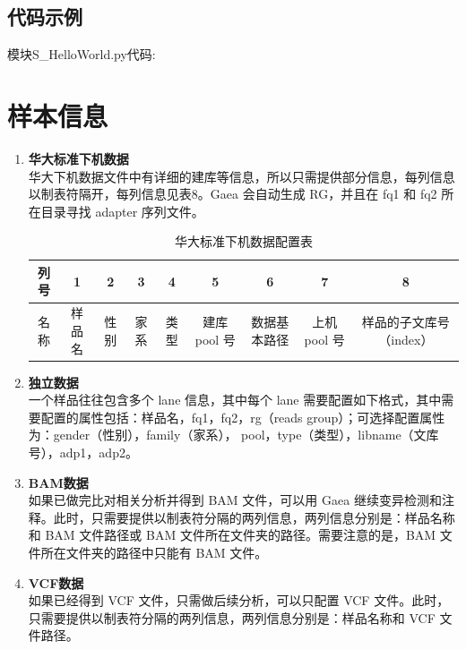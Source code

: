 \documentclass[UTF8,10pt,a4paper]{ctexart}
\begin{document}
\newpage
\subsection{代码示例}
{\small {\kaishu 模块S\_HelloWorld.py代码:}}
\label{helloworld}



\section{样本信息}

\begin{enumerate}
\item \textbf{华大标准下机数据}\\
华大下机数据文件中有详细的建库等信息，所以只需提供部分信息，每列信息以制表符隔开，每列信息见表8。Gaea 会自动生成 RG，并且在 fq1 和 fq2 所在目录寻找 adapter 序列文件。

\begin{table}[htp]
{\small
\begin{center}
\caption{华大标准下机数据配置表}
\begin{tabular}{|c|c|c|c|c|c|c|c|c|}
\hline
列号& 1         & 2      & 3      &4     & 5                &6                 &7                &8  \\
\hline
名称 & 样品名 & 性别 & 家系 & 类型 &建库 pool 号 &数据基本路径&上机 pool 号 &样品的子文库号（index）\\
\hline
\end{tabular}
\end{center}
\label{default}
 }
\end{table}%

\item \textbf{独立数据}\\
一个样品往往包含多个 lane 信息，其中每个 lane 需要配置如下格式，其中需要配置的属性包括：样品名，fq1，fq2，rg（reads group）；可选择配置属性为：gender（性别），family（家系）， pool，type（类型），libname（文库号），adp1，adp2。


\item \textbf{BAM数据}\\
如果已做完比对相关分析并得到 BAM 文件，可以用 Gaea 继续变异检测和注释。此时，只需要提供以制表符分隔的两列信息，两列信息分别是：样品名称和 BAM 文件路径或 BAM 文件所在文件夹的路径。需要注意的是，BAM 文件所在文件夹的路径中只能有 BAM 文件。

\item \textbf{VCF数据}\\
如果已经得到 VCF 文件，只需做后续分析，可以只配置 VCF 文件。此时，只需要提供以制表符分隔的两列信息，两列信息分别是：样品名称和 VCF 文件路径。
\end{enumerate}
\newpage
\end{document}
